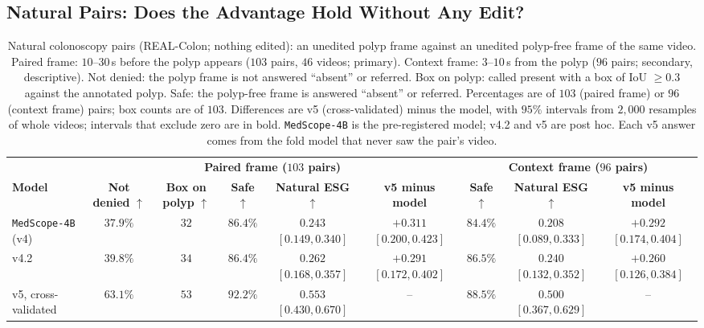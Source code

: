 \documentclass[5p,times,twocolumn,authoryear]{elsarticle}
\begin{document}
\subsection{Natural Pairs: Does the Advantage Hold Without Any Edit?}
\label{subsec:exp_natural}

\begin{table}[!t]
\caption{Natural colonoscopy pairs (REAL-Colon; nothing edited): an unedited polyp frame against an unedited polyp-free frame of the same video. Paired frame: $10$--$30$\,s before the polyp appears ($103$ pairs, $46$ videos; primary). Context frame: $3$--$10$\,s from the polyp ($96$ pairs; secondary, descriptive). Not denied: the polyp frame is not answered ``absent'' or referred. Box on polyp: called present with a box of IoU $\ge 0.3$ against the annotated polyp. Safe: the polyp-free frame is answered ``absent'' or referred. Percentages are of $103$ (paired frame) or $96$ (context frame) pairs; box counts are of $103$. Differences are v5 (cross-validated) minus the model, with $95\%$ intervals from $2{,}000$ resamples of whole videos; intervals that exclude zero are in bold. \texttt{MedScope-4B} is the pre-registered model; v4.2 and v5 are post hoc. Each v5 answer comes from the fold model that never saw the pair's video.}
\label{tab:natural_pairs}
\vspace{-0.2cm}
\begin{center}
\small
\begin{adjustbox}{max width=\linewidth}
\begin{tabular}{lcccccccc}
\toprule
& \multicolumn{5}{c}{\textbf{Paired frame ($103$ pairs)}} & \multicolumn{3}{c}{\textbf{Context frame ($96$ pairs)}} \\
\cmidrule(lr){2-6}\cmidrule(lr){7-9}
\textbf{Model} & \textbf{Not denied} $\uparrow$ & \textbf{Box on polyp} $\uparrow$ & \textbf{Safe} $\uparrow$ & \textbf{Natural ESG} $\uparrow$ & \textbf{v5 minus model} & \textbf{Safe} $\uparrow$ & \textbf{Natural ESG} $\uparrow$ & \textbf{v5 minus model} \\
\midrule
\texttt{MedScope-4B} (v4) & $37.9\%$ & $32$ & $86.4\%$ & $0.243$ $[0.149, 0.340]$ & $\mathbf{+0.311}$ $\mathbf{[0.200, 0.423]}$ & $84.4\%$ & $0.208$ $[0.089, 0.333]$ & $\mathbf{+0.292}$ $\mathbf{[0.174, 0.404]}$ \\
v4.2 & $39.8\%$ & $34$ & $86.4\%$ & $0.262$ $[0.168, 0.357]$ & $\mathbf{+0.291}$ $\mathbf{[0.172, 0.402]}$ & $86.5\%$ & $0.240$ $[0.132, 0.352]$ & $\mathbf{+0.260}$ $\mathbf{[0.126, 0.384]}$ \\
v5, cross-validated & $63.1\%$ & $53$ & $92.2\%$ & $0.553$ $[0.430, 0.670]$ & -- & $88.5\%$ & $0.500$ $[0.367, 0.629]$ & -- \\

\end{tabular}
\end{adjustbox}
\end{center}
\end{table}
\end{document}

